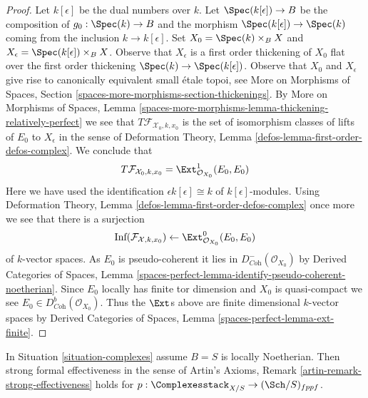 \begin{proof}
\medskip\noindent
Let $k[\epsilon]$ be the dual numbers over $k$.
Let $\Spec(k[\epsilon]) \to B$ be the composition of $g_0 : \Spec(k) \to B$
and the morphism $\Spec(k[\epsilon]) \to \Spec(k)$
coming from the inclusion $k \to k[\epsilon]$.
Set $X_0 = \Spec(k) \times_B X$ and
$X_\epsilon = \Spec(k[\epsilon]) \times_B X$.
Observe that $X_\epsilon$ is a first order thickening of $X_0$
flat over the first order thickening $\Spec(k) \to \Spec(k[\epsilon])$.
Observe that $X_0$ and $X_\epsilon$ give rise to canonically equivalent
small \'etale topoi, see
More on Morphisms of Spaces, Section
\ref{spaces-more-morphisms-section-thickenings}.
By More on Morphisms of Spaces, Lemma
\ref{spaces-more-morphisms-lemma-thickening-relatively-perfect}
we see that $T\mathcal{F}_{\mathcal{X}_0, k, x_0}$ is the set of
isomorphism classes of lifts of $E_0$ to $X_\epsilon$ in the sense of
Deformation Theory, Lemma \ref{defos-lemma-first-order-defos-complex}.
We conclude that
$$
T\mathcal{F}_{\mathcal{X}_0, k, x_0} =
\Ext^1_{\mathcal{O}_{X_0}}(E_0, E_0)
$$
Here we have used the identification $\epsilon k[\epsilon] \cong k$
of $k[\epsilon]$-modules. Using
Deformation Theory, Lemma \ref{defos-lemma-first-order-defos-complex}
once more we see that there is a surjection
$$
\text{Inf}(\mathcal{F}_{\mathcal{X}, k, x_0})
\leftarrow
\Ext^0_{\mathcal{O}_{X_0}}(E_0, E_0)
$$
of $k$-vector spaces. As $E_0$ is pseudo-coherent it lies in
$D^-_{\textit{Coh}}(\mathcal{O}_{X_0})$ by
Derived Categories of Spaces, Lemma
\ref{spaces-perfect-lemma-identify-pseudo-coherent-noetherian}.
Since $E_0$ locally has finite tor dimension and $X_0$
is quasi-compact we see $E_0 \in D^b_{\textit{Coh}}(\mathcal{O}_{X_0})$.
Thus the $\Ext$s above are finite dimensional $k$-vector spaces
by Derived Categories of Spaces, Lemma
\ref{spaces-perfect-lemma-ext-finite}.
\end{proof}

\begin{lemma}
\label{lemma-complexes-strong-effectiveness}
In Situation \ref{situation-complexes} assume $B = S$ is locally Noetherian.
Then strong formal effectiveness in the sense of
Artin's Axioms, Remark \ref{artin-remark-strong-effectiveness}
holds for $p : \Complexesstack_{X/S} \to (\Sch/S)_{fppf}$.
\end{lemma}

